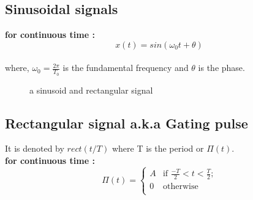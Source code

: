 \documentclass[a4paper,12pt]{book}
\begin{document}
\subsection*{Sinusoidal signals}
{\bf for continuous time :}\\
	 $$ x(t) = sin(\omega_0 t+ \theta)$$ \\
where, $\omega_0 = \frac{2\pi}{T_0}$ is the fundamental frequency and $\theta$ is the phase.\\
\begin{figure}[h]  
\centering 
{}
\caption{a sinusoid and rectangular signal} \label{fig:M}  
\end{figure}

\subsection*{ Rectangular signal a.k.a Gating pulse}
It is denoted by $rect(t/T)$ where T is the period or $\Pi(t)$.\\
{\bf for continuous time :}\\
	\[ \Pi(t) = \left\{ \begin{array}{ll}

	A & \mbox{if $\frac{-T}{2}< t <\frac{T}{2}$;} \\

	0 & \mbox{otherwise} \\
	\end{array}
	\right. \]
\pagebreak
\end{document}
